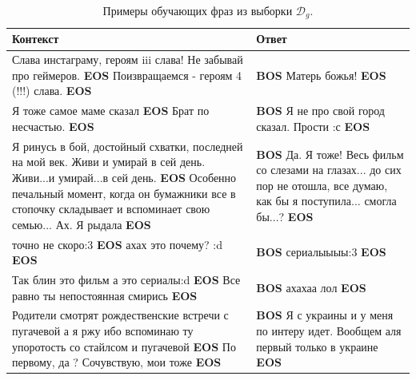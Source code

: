 \documentclass[12pt,a4paper]{amsart}
\begin{document}
\begin{center}
	\begin{table}[htbp]
		\caption{Примеры обучающих фраз из выборки $ \mathcal{D}_g $.}
		\label{table:belikex-twitter-general}
		\begin{tabulary}{\textwidth}{|L|L|}
			\hline
			Контекст & Ответ \\
			\hline \hline
			Слава инстаграму, героям iii слава! Не забывай про геймеров. \textbf{EOS} Поизвращаемся - героям 4 (!!!) слава. \textbf{EOS} & \textbf{BOS} Матерь божья!  \textbf{EOS} \\
			\hline
			Я тоже самое маме сказал \textbf{EOS} Брат по несчастью. \textbf{EOS} & \textbf{BOS} Я не про свой город сказал. Прости :с \textbf{EOS} \\
			\hline
			Я ринусь в бой, достойный схватки, последней на мой век. Живи и умирай в сей день. Живи...и умирай...в сей день. \textbf{EOS} Особенно печальный момент, когда он бумажники все в стопочку складывает и вспоминает свою семью... Ах. Я рыдала \textbf{EOS} & \textbf{BOS} Да. Я тоже! Весь фильм со слезами на глазах... до сих пор не отошла, все думаю, как бы я поступила... смогла бы...? \textbf{EOS} \\
			\hline 
			точно не скоро:3 \textbf{EOS} ахах это почему? :d \textbf{EOS} & \textbf{BOS} сериалыыыы:3 \textbf{EOS} \\
			\hline
			Так блин это фильм а это сериалы:d \textbf{EOS} Все равно ты непостоянная смирись \textbf{EOS} & \textbf{BOS} ахахаа лол \textbf{EOS} \\
			\hline
			Родители смотрят рождественские встречи с пугачевой а я ржу ибо вспоминаю ту упоротость со стайлсом и пугачевой \textbf{EOS} По первому, да ? Сочувствую, мои тоже \textbf{EOS} & \textbf{BOS} Я с украины и у меня по интеру идет. Вообщем аля первый только в украине \textbf{EOS} \\
			\hline 
		\end{tabulary}
	\end{table}
\end{center}
\end{document}
